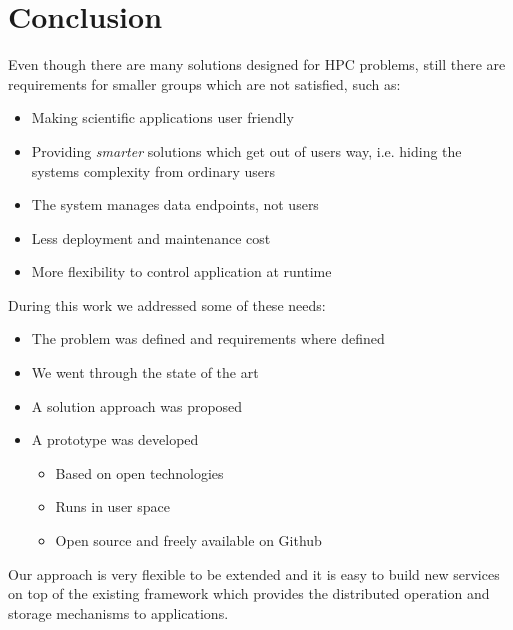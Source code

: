 \chapter{Conclusion}
\label{cha:conclusion}

Even though there are many solutions designed for HPC problems, still there are requirements for smaller groups which are not satisfied, such as:
\begin{itemize}
\item Making scientific applications user friendly 
\item Providing \textit{smarter} solutions which get out of users way, i.e. hiding the systems complexity from ordinary users
\item The system manages data endpoints, not users
\item Less deployment and maintenance cost
\item More flexibility to control application at runtime
\end{itemize}
During this work we addressed some of these needs:
\begin{itemize}
\item The problem was defined and requirements where defined
\item We went through the state of the art
\item A solution approach was proposed
\item A prototype was developed
\begin{itemize}
\fontsize{30pt}{31}\selectfont
\item Based on open technologies
\item Runs in user space
\item Open source and freely available on Github
\end{itemize}
\end{itemize}
Our approach is very flexible to be extended and it is easy to build new services on top of the existing framework 
which provides the distributed operation and storage mechanisms to applications.

